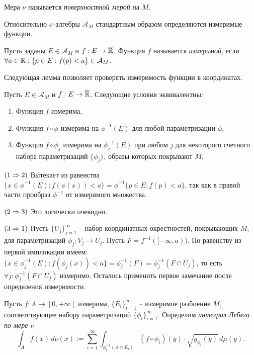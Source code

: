 \begin{definition}
	Мера $\nu$ называется \textit{поверхностной мерой} на $M$.
\end{definition}

Относительно $\sigma$-алгебры $\mathcal{A}_M$ стандартным образом определяются измеримые функции.

\begin{definition}
	Пусть заданы $E \in \mathcal{A}_M$ и $f : E \to \overline{\mathbb{R}}$.
	Функция $f$ называется \textit{измеримой}, если $\forall a \in \mathbb{R} : \{p \in E : f(p) < a\} \in \mathcal{A}_M$.
\end{definition}

Следующая лемма позволяет проверять измеримость функции в координатах.

\begin{lemma}
	Пусть $E \in \mathcal{A}_M$ и $f : E \to \overline{\mathbb{R}}$. 
	Следующие условия эквивалентны: 
	\begin{enumerate}[itemsep = 0pt, topsep = 5pt]
		\item Функция $f$ измерима, 
		\item Функция $f \circ \phi$ измерима на $\phi^{-1}(E)$ для любой параметризации $\phi$, 
		\item Функция $f \circ \phi_j$ измерима на $\phi^{-1}_j(E)$ при любом $j$ для некоторого счетного набора параметризаций $\{\phi_j\}$, образы которых покрывают $M$.  
	\end{enumerate}
\end{lemma}

\begin{myproof}
	$(1 \Rightarrow 2)$ Вытекает из равенства $\{x \in \phi^{-1}(E) : f(\phi(x)) < a\} = \phi^{-1} \{p \in E : f(p) < a\}$, так как в правой части прообраз $\phi^{-1}$ от измеримого множества.

	\vspace{5pt}
	$(2 \Rightarrow 3)$ Это логически очевидно.

	\vspace{5pt}
	$(3 \Rightarrow 1)$ Пусть $\{U_j\}_{j=1}^{\infty}$ -- набор координатных окрестностей, покрывающих $M$, для параметризаций $\phi_j : V_j \to U_j$. 
	Пусть $F = f^{-1}([-\infty, a))$. По равенству из первой импликации имеем: $\{x \in \phi^{-1}_j(E) : f(\phi_j(x)) < a\} = \phi_j^{-1}(F) = \phi_j^{-1}(F \cap U_j)$, то есть $\forall j : \phi^{-1}_j(F \cap U_j)$ измеримо. 
	Осталось применить первое замечание после определения измеримости.
\end{myproof}

\begin{definition}
	Пусть $f : A \to [0, +\infty]$ измерима, $\{E_i\}_{i=1}^{\infty}$ -- измеримое разбиение $M$, соответствующее набору параметризаций $\{\phi_i\}_{i=1}^{\infty}$.
	Определим \textit{интеграл Лебега по мере $\nu$}
	\[ \int_{A} f(x) \, d\nu(x) := \sum \limits_{i=1}^{\infty} \int_{\phi_{i}^{-1}(A \cap E_i)} (f \circ \phi_i)(y) \cdot \sqrt{g_{\phi_i}(y)} \, d\mu(y). \tag{$**$}\]
\end{definition}

